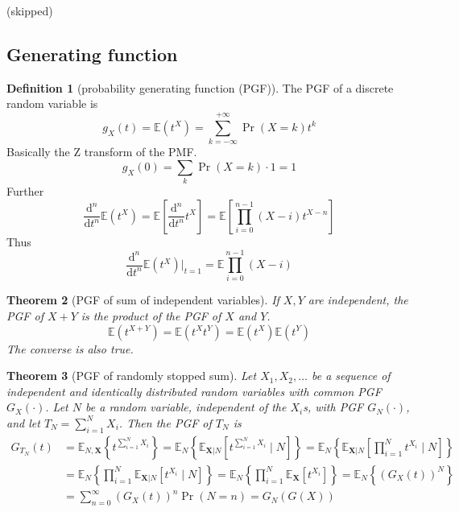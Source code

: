 \documentclass{article}
\newtheorem{theorem}{Theorem}[section]
\theoremstyle{definition}
\newtheorem{definition}[theorem]{Definition}
\theoremstyle{remark}
\newcommand{\E}{\mathbb{E}}
\begin{document}
(skipped)

\subsection{Generating function}

\begin{definition}[probability generating function (PGF)]
	The PGF of a discrete random variable is
	\[
		g_X(t) = \E(t^X) = \sum_{k=-\infty}^{+\infty} \Pr(X=k) t^k
	\]
	Basically the Z transform of the PMF.
	\[
		g_X(0) = \sum_k \Pr(X=k) \cdot 1 = 1
	\]
	Further
	\[
		\frac{\mathrm{d}^n}{\mathrm{d}t^n}\E(t^X) =
		\E\left[\frac{\mathrm{d}^n}{\mathrm{d}t^n} t^X \right] = \E\left[ \prod_{i=0}^{n-1} (X-i) t^{X-n} \right]
	\]
	Thus
	\[
		\frac{\mathrm{d}^n}{\mathrm{d}t^n}\E(t^X) \vert_{t=1} = \E \prod_{i=0}^{n-1} (X-i)
	\]
\end{definition}
\begin{theorem}[PGF of sum of independent variables]
	If \(X,Y\) are independent, the PGF of \(X+Y\) is the product of the PGF of \(X\) and \(Y\).
	\[
		\E(t^{X+Y}) = \E(t^X t^Y) = \E(t^X) \E(t^Y)
	\]
	The converse is also true.
\end{theorem}
\begin{theorem}[PGF of randomly stopped sum]
	Let \(X_1, X_2, \ldots\) be a sequence of independent and identically distributed random variables with common PGF \(G_X(\cdot)\). Let \(N\) be a random variable, independent of the \(X_i\)s, with PGF \(G_N(\cdot)\), and let \(T_N=\sum_{i=1}^N X_i\).
	Then the PGF of \(T_N\) is
	\begin{align*}
		G_{T_N}(t) & = \E_{N,\mathbf{X}}\left\{ t^{\sum_{i=1}^N X_i} \right\}
		= \E_N\left\{ \E_{\mathbf{X}|N}\left[ t^{\sum_{i=1}^N X_i} \mid N \right] \right\}
		= \E_N\left\{ \E_{\mathbf{X}|N}\left[ \prod_{i=1}^N t^{X_i} \mid N \right] \right\}               \\
		           & = \E_N\left\{ \prod_{i=1}^N \E_{\mathbf{X}|N}\left[  t^{X_i} \mid N \right] \right\}
		= \E_N\left\{ \prod_{i=1}^N \E_{\mathbf{X}}\left[  t^{X_i} \right] \right\}
		= \E_N\left\{ {(G_X(t))}^N \right\}                                                               \\
		           & = \sum_{n=0}^{\infty} {(G_X(t))}^n \Pr(N=n)
		= G_N(G(X))
	\end{align*}
\end{theorem}
\end{document}

